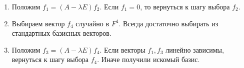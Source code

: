 \documentclass{article}
\begin{document}
\begin{enumerate}
\begin{enumerate}
\item Положим $f_1 = (A - \lambda E) f_2$.
Если $f_1 = 0$, то вернуться к шагу выбора $f_2$.

\item Выбираем вектор $f_4$ случайно в $F^4$.
Всегда достаточно выбирать из стандартных базисных векторов.

\item Положим $f_3 = (A - \lambda E) f_4$.
Если векторы $f_1,  f_3$ линейно зависимы, вернуться к шагу выбора $f_4$.
Иначе получили искомый базис.

\end{enumerate}
\end{enumerate}
\end{document}
